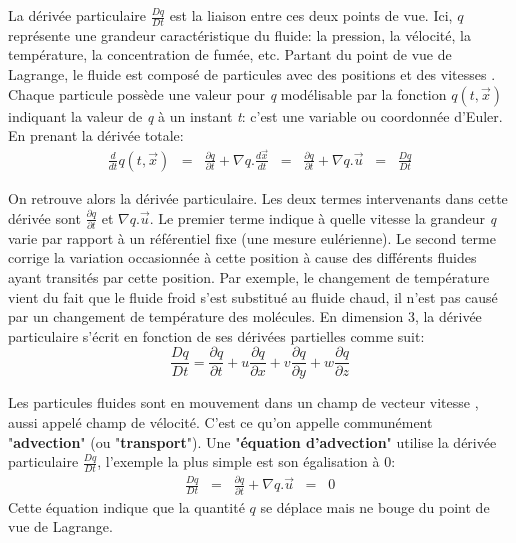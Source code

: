 \documentclass[11pt]{article}
\begin{document}
La dérivée particulaire $ \frac{Dq}{Dt} $ est la liaison entre ces deux points de vue. Ici, $q$ représente une grandeur caractéristique du fluide: la pression, la vélocité, la température, la concentration de fumée, etc. Partant du point de vue de Lagrange, le fluide est composé de particules avec des positions  et des vitesses . Chaque particule possède une valeur pour \textit{q} modélisable par la fonction $ q(t,\overrightarrow{x}) $ indiquant la valeur de \textit{q} à un instant \textit{t}: c'est une variable ou coordonnée d'Euler. En prenant la dérivée totale:
	\begin{eqnarray}
	\frac{d}{dt} q(t, \overrightarrow{x}) 
\;\; = \;\; \frac{\partial q}{\partial t} + \nabla q. \frac{d\overrightarrow{x}}{dt} \;\; = \;\; \frac{\partial q}{\partial t} + \nabla q. \overrightarrow{u} \;\; = \;\; \frac{Dq}{Dt}
	\end{eqnarray}

On retrouve alors la dérivée particulaire. Les deux termes intervenants dans cette dérivée sont $ \frac{\partial q}{\partial t} $ et  $ \nabla q. \overrightarrow{u} $. Le premier terme indique à quelle vitesse la grandeur \textit{q} varie par rapport à un référentiel fixe (une mesure eulérienne). Le second terme corrige la variation occasionnée à cette position à cause des différents fluides ayant transités par cette position. Par exemple, le changement de température vient du fait que le fluide froid s'est substitué au fluide chaud, il n'est pas causé par un changement de température des molécules.
En dimension 3, la dérivée particulaire s'écrit en fonction de ses dérivées partielles comme suit:
	\begin{equation}
	\frac{Dq}{Dt} 
 =  \frac{\partial q}{\partial t} + u \frac{\partial q}{\partial x} + v \frac{\partial q}{\partial y} + w \frac{\partial q}{\partial z}
	\end{equation}

Les particules fluides sont en mouvement dans un champ de vecteur vitesse , aussi appelé champ de vélocité. C'est ce qu'on appelle communément "\textbf{advection}" (ou "\textbf{transport}"). Une "\textbf{équation d'advection}" utilise la dérivée particulaire $ \frac{Dq}{Dt} $, l'exemple la plus simple est son égalisation à $0$:
	\begin{eqnarray}
	\frac{Dq}{Dt} \;\; = \;\; \frac{\partial q}{\partial t} + \nabla q. \overrightarrow{u} \;\; = \;\; 0
	\end{eqnarray}
Cette équation indique que la quantité $q$ se déplace mais ne bouge du point de vue de Lagrange.
\end{document}
